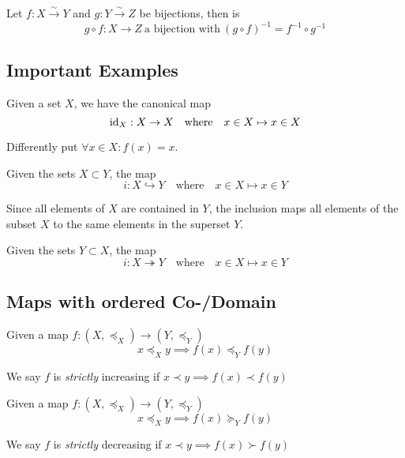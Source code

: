 \begin{proposition}
   Let \(f: X \xrightarrow{\sim} Y\) and \(g: Y \xrightarrow{\sim} Z\) be bijections, then is
   \[g \circ f: X \to Z~\text{a bijection with}~(g \circ f)^{-1} = f^{-1} \circ g^{-1}\]
\end{proposition}

\subsection{Important Examples}
\begin{definition}
   Given a set \(X\), we have the canonical map
   \[\operatorname{id}_X: X \to X \quad\text{where}\quad x \in X \mapsto x \in X\]
\end{definition}
\begin{remark}[Intuition]
   Differently put \(\forall x \in X: f(x) = x\).
\end{remark}

\begin{definition}
   Given the sets \(X \subset Y\), the map
   \[i: X \hookrightarrow Y \quad\text{where}\quad x \in X \mapsto x \in Y\]
\end{definition}
\begin{remark}[Intuition]
   Since all elements of \(X\) are contained in \(Y\), the inclusion maps all elements of the subset \(X\) to the same elements in the superset \(Y\).
\end{remark}

\begin{definition}\label{def:projection}
   Given the sets \(Y \subset X\), the map
   \[i: X \twoheadrightarrow Y \quad\text{where}\quad x \in X \mapsto x \in Y\]
\end{definition}

\subsection{Maps with ordered Co-/Domain}
\begin{definition}
   Given a map \(f: (X, \preceq_X) \to (Y, \preceq_Y)\)
   \[x \preceq_X y \implies f(x) \preceq_Y f(y)\]
\end{definition}
\begin{remark}[Terminology]
   We say \(f\) is \emph{strictly} increasing if \(x \prec y \implies f(x) \prec f(y)\)
\end{remark}

\begin{definition}
   Given a map \(f: (X, \preceq_X) \to (Y, \preceq_Y)\)
   \[x \preceq_X y \implies f(x) \succeq_Y f(y)\]
\end{definition}
\begin{remark}[Terminology]
   We say \(f\) is \emph{strictly} decreasing if \(x \prec y \implies f(x) \succ f(y)\)
\end{remark}

